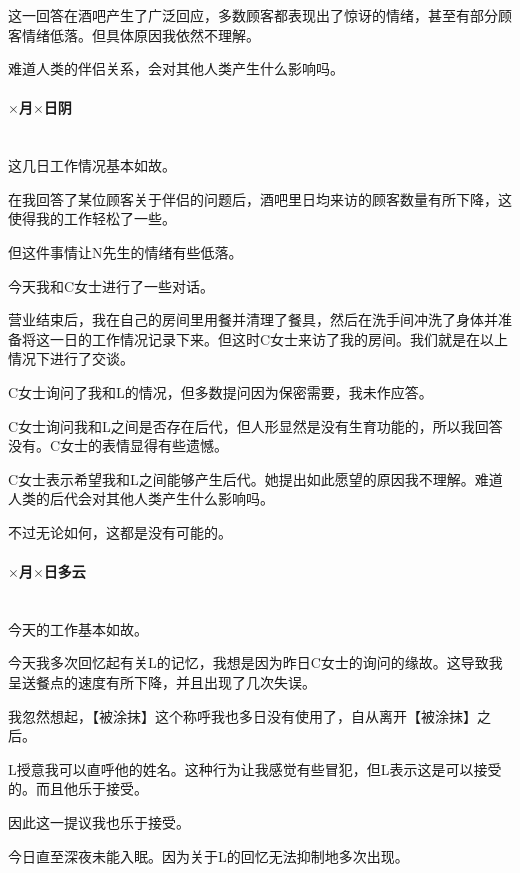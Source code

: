 这一回答在酒吧产生了广泛回应，多数顾客都表现出了惊讶的情绪，甚至有部分顾客情绪低落。但具体原因我依然不理解。

难道人类的伴侣关系，会对其他人类产生什么影响吗。

\par

\paragraph*{$\times$月$\times$日\quad 阴}\mbox{}\\

这几日工作情况基本如故。

在我回答了某位顾客关于伴侣的问题后，酒吧里日均来访的顾客数量有所下降，这使得我的工作轻松了一些。

但这件事情让N先生的情绪有些低落。

今天我和C女士进行了一些对话。

营业结束后，我在自己的房间里用餐并清理了餐具，然后在洗手间冲洗了身体并准备将这一日的工作情况记录下来。但这时C女士来访了我的房间。我们就是在以上情况下进行了交谈。

C女士询问了我和L的情况，但多数提问因为保密需要，我未作应答。

C女士询问我和L之间是否存在后代，但人形显然是没有生育功能的，所以我回答没有。C女士的表情显得有些遗憾。

C女士表示希望我和L之间能够产生后代。她提出如此愿望的原因我不理解。难道人类的后代会对其他人类产生什么影响吗。

不过无论如何，这都是没有可能的。

\par

\paragraph*{$\times$月$\times$日\quad 多云}\mbox{}\\

今天的工作基本如故。

今天我多次回忆起有关L的记忆，我想是因为昨日C女士的询问的缘故。这导致我呈送餐点的速度有所下降，并且出现了几次失误。

我忽然想起，【被涂抹】这个称呼我也多日没有使用了，自从离开【被涂抹】之后。

L授意我可以直呼他的姓名。这种行为让我感觉有些冒犯，但L表示这是可以接受的。而且他乐于接受。

因此这一提议我也乐于接受。

今日直至深夜未能入眠。因为关于L的回忆无法抑制地多次出现。

